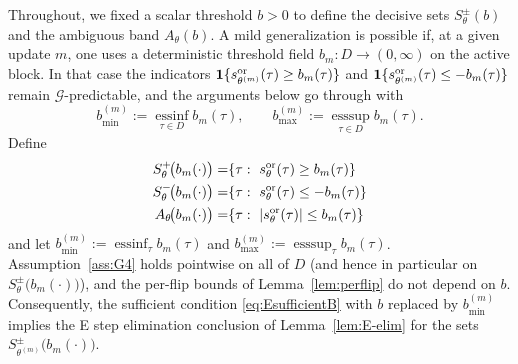 \documentclass{statsoc}
\newcommand{\1}{\mathbbm{1}}
\begin{document}
Throughout, we fixed a scalar threshold \(b>0\) to define the decisive sets \(S_\theta^\pm(b)\) and the ambiguous band \(A_\theta(b)\). A mild generalization is possible if, at a given update \(m\), one uses a deterministic threshold field
\(b_m:D\to(0,\infty)\) on the active block. In that case the indicators
\(\mathbf 1\{s^{\rm or}_{\theta^{(m)}}(\tau)\ge b_m(\tau)\}\) and
\(\mathbf 1\{s^{\rm or}_{\theta^{(m)}}(\tau)\le -b_m(\tau)\}\)
remain \(\mathcal G\)-predictable, and the arguments below go through with
\[
b_{\min}^{(m)}:=\operatorname*{ess inf}_{\tau\in D} b_m(\tau),
\qquad
b_{\max}^{(m)}:=\operatorname*{ess sup}_{\tau\in D} b_m(\tau).
\]
 Define
\begin{align*}
S_\theta^+\!\big(b_m(\cdot)\big)=&\{\tau:\ s^{\rm or}_\theta(\tau)\ge b_m(\tau)\}\\
S_\theta^-\!\big(b_m(\cdot)\big)=&\{\tau:\ s^{\rm or}_\theta(\tau)\le - b_m(\tau)\}\\
A_\theta\!\big(b_m(\cdot)\big)=&\{\tau:\ |s^{\rm or}_\theta(\tau)|\le b_m(\tau)\}
\end{align*}
and let \(b_{\min}^{(m)}:=\operatorname*{ess inf}_\tau b_m(\tau)\) and \(b_{\max}^{(m)}:=\operatorname*{ess sup}_\tau b_m(\tau)\).
Assumption~\ref{ass:G4} holds pointwise on all of $D$ (and hence in particular on $S_\theta^\pm\!\big(b_m(\cdot)\big)$), and the per-flip bounds of Lemma~\ref{lem:perflip} do not depend on $b$. Consequently, the sufficient condition \eqref{eq:EsufficientB} with \(b\) replaced by \(b_{\min}^{(m)}\) implies the E step elimination conclusion of Lemma~\ref{lem:E-elim} for the sets \(S_{\theta^{(m)}}^\pm\!\big(b_m(\cdot)\big)\).
\end{document}
